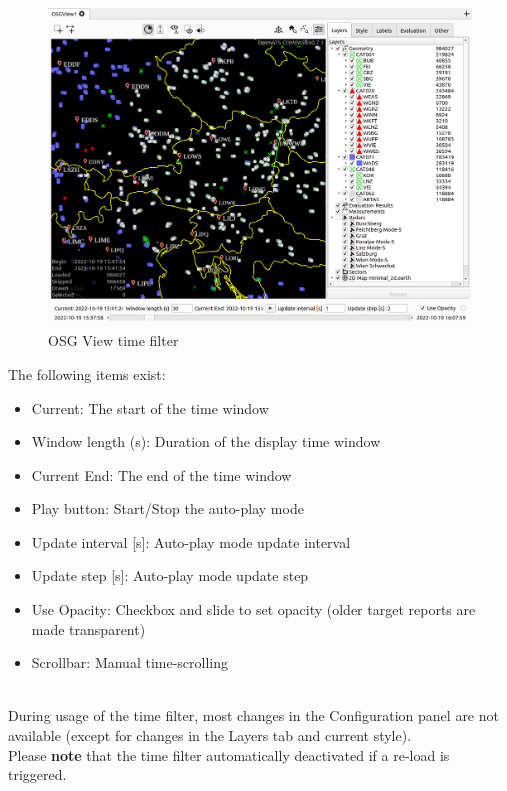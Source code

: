 \begin{figure}[H]
    \hspace*{-2.5cm}
    \includegraphics[width=19cm,frame]{figures/osgview_time_filter.png}
  \caption{OSG View time filter}
  \label{fig:osgview_time_filter}
\end{figure}

The following items exist:

\begin{itemize}
 \item Current: The start of the time window
 \item Window length (s): Duration of the display time window
 \item Current End: The end of the time window
 \item Play button: Start/Stop the auto-play mode
 \item Update interval [s]: Auto-play mode update interval
 \item Update step [s]: Auto-play mode update step
 \item Use Opacity: Checkbox and slide to set opacity (older target reports are made transparent)
 \item Scrollbar: Manual time-scrolling
\end{itemize}
\ \\

During usage of the time filter, most changes in the Configuration panel are not available (except for changes in the Layers tab and current style). \\

Please \textbf{note} that the time filter automatically deactivated if a re-load is triggered.

